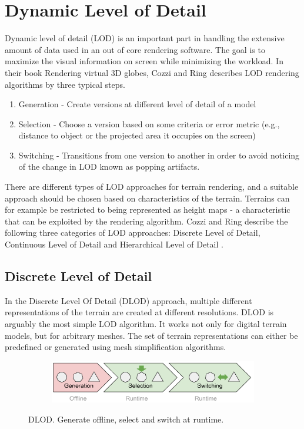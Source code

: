 \section{Dynamic Level of Detail}
Dynamic level of detail (LOD) is an important part in handling the extensive amount of data used in an out of core rendering software. The goal is to maximize the visual information on screen while minimizing the workload. In their book Rendering virtual 3D globes, Cozzi and Ring describes LOD rendering algorithms by three typical steps. \cite[p. 367]{cozzi11}

\begin{enumerate}
    \item Generation - Create versions at different level of detail of a model
    \item Selection - Choose a version based on some criteria or error metric (e.g., distance to object or the projected area it occupies on the screen)
    \item Switching - Transitions from one version to another in order to avoid noticing of the change in LOD known as popping artifacts.
\end{enumerate}

There are different types of LOD approaches for terrain rendering, and a suitable approach should be chosen based on characteristics of the terrain. Terrains can for example be restricted to being represented as height maps - a characteristic that can be exploited by the rendering algorithm. Cozzi and Ring describe the following three categories of LOD approaches: Discrete Level of Detail, Continuous Level of Detail and Hierarchical Level of Detail \cite[p. 368-371]{cozzi11}.

\subsection{Discrete Level of Detail}
In the Discrete Level Of Detail (DLOD) approach, multiple different representations of the terrain are created at different resolutions. DLOD is arguably the most simple LOD algorithm. It works not only for digital terrain models, but for arbitrary meshes. The set of terrain representations can either be predefined or generated using mesh simplification algorithms.

\begin{figure}[htbp]
    \centering
    \begin{subfigure}[bt]{0.9\textwidth}
        \includegraphics[width=\textwidth]{figures/lod/lod_overview.pdf}
    \end{subfigure}
    \caption{DLOD. Generate offline, select and switch at runtime.}
    \label{fig:lod}
\end{figure}

